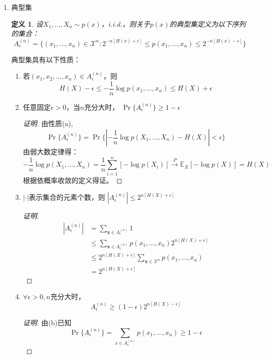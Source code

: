 \documentclass{article}
\newtheorem{definition}{定义}
\def\E{\mathbb{E}}
\begin{document}
\begin{enumerate}
\begin{enumerate}[label=(\alph*)]
\begin{proof}
$$$$
并由$H(Y_n|Y_{n-1},\dots,Y_1,X_1)$递增的特性知\eqref{eq:ineqH}式左端成立。
\end{proof}
\end{enumerate}
\item 典型集
\begin{definition}
设$X_1,\dots,X_n\sim p(x)$，i.i.d.，则关于$p(x)$的典型集定义为以下序列的集合：
\begin{equation}
A^{(n)}_{\epsilon} = \{ (x_1,\dots,x_n) \in \mathcal{X}^n: 2^{-n[H(x)+\epsilon]} \leq p(x_1,\dots,x_n) \leq 2^{-n[H(x)-\epsilon]}  \}
\end{equation}
\end{definition}
典型集具有以下性质：
\begin{enumerate}[label=(\alph*)]
\item 若$(x_1,x_2,\dots,x_n) \in A^{(n)}_{\epsilon}$，则
\begin{equation}
H(X) - \epsilon \leq -\frac{1}{n} \log p(x_1,\dots,x_n) \leq H(X) + \epsilon
\end{equation}
\item 任意固定$\epsilon >0 $，当$n$充分大时，
$\Pr\{A^{(n)}_{\epsilon}\} \geq 1-\epsilon$
\begin{proof}[证明]
由性质(a),
$$
\Pr\{A^{(n)}_{\epsilon}\} = \Pr\{|-\frac{1}{n} \log p(X_1,\dots,X_n)-H(X)|<\epsilon \} 
$$
由弱大数定律得：
$$
-\frac{1}{n} \log p(X_1,\dots,X_n) = \frac{1}{n}\sum_{i=1}^n [-\log p(X_i)] \xrightarrow{P} \E_X[-\log p(X)]=H(X)
$$
根据依概率收敛的定义得证。
\end{proof}
\item $|\cdot|$表示集合的元素个数，则
$|A_{\epsilon}^{(n)}|\leq 2^{n[H(X)+\epsilon]}$
\begin{proof}[证明]
\begin{align*}
|A_{\epsilon}^{(n)}| & = \sum_{\bm{x}\in A_{\epsilon}^{(n)}} 1 \\
 & \leq \sum_{\bm{x}\in A_{\epsilon}^{(n)}} p(x_1,\dots,x_n) 2^{n[H(X)+\epsilon]} \\
 & \leq 2^{n[H(X)+\epsilon]} \sum_{\bm{x}\in \mathcal{X}^n} p(x_1,\dots,x_n) \\
 & = 2^{n[H(X)+\epsilon]}
\end{align*}
\end{proof}
\item $\forall \epsilon >0, n$充分大时，
$$
A_{\epsilon}^{(n)} \geq (1-\epsilon)2^{n[H(X)-\epsilon]}
$$
\begin{proof}[证明]
由(b)已知
$$
\Pr\{A^{(n)}_{\epsilon}\} = \sum_{x\in A^{(n)}_{\epsilon}} p(x_1,\dots,x_n) \geq 1-\epsilon
$$
\end{proof}
\end{enumerate}
\end{enumerate}
\end{document}
